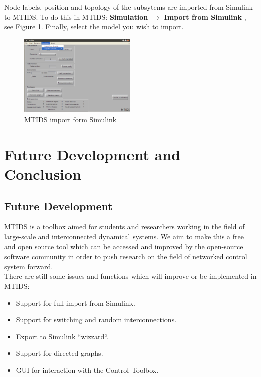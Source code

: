\documentclass[a4paper,twoside, openright,12pt]{report}
\begin{document}
Node labels, position and topology of the subsytems are imported from Simulink to MTIDS.
To do this in MTIDS: \textbf{Simulation $\rightarrow$ Import from Simulink }, see Figure \ref{mtidsImportFig}. Finally, select the model you wish to import.

\begin{figure}[htb]
\centering
\includegraphics[width=0.5\textwidth]{pics/mtidsImport.eps}
\caption[MTIDS import form Simulink]{MTIDS import form Simulink}
\label{mtidsImportFig}
\end{figure} 

\chapter{Future Development and Conclusion}


\section{Future Development}

MTIDS is a toolbox aimed for students and researchers working in the field of large-scale and interconnected dynamical systems. 
We aim to make this a free and open source tool which can be accessed and improved by the open-source software community in order to
 push research on the field of networked control system forward.\\

There are still some issues and functions which will improve or be implemented in MTIDS:
\begin{itemize}
 \item Support for full import from Simulink.
 \item Support for switching and random interconnections.
 \item Export to Simulink ``wizzard``.
 \item Support for directed graphs.
 \item GUI for interaction with the Control Toolbox.
\end{itemize}
\vspace{5cm} 
\pagebreak 
\end{document}
